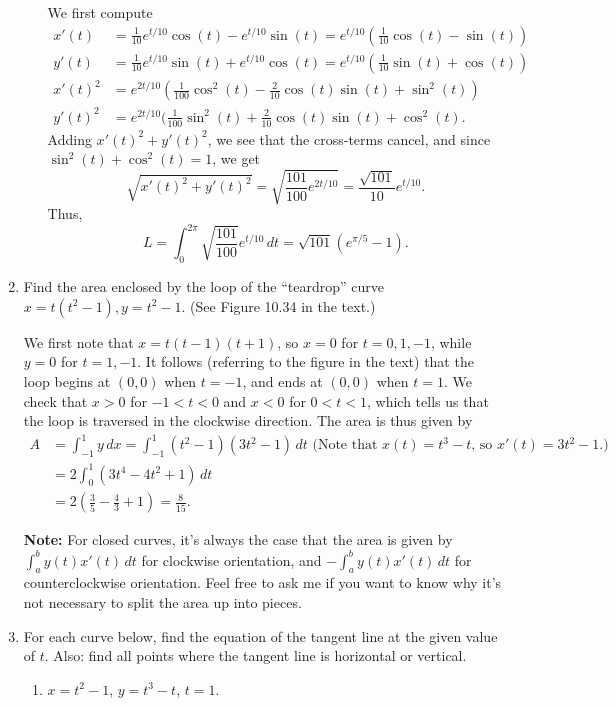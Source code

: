 \documentclass[12pt]{article}
\newcommand{\di}{\displaystyle}
\begin{document}
\begin{enumerate}
\begin{enumerate}
 We first compute
 \begin{align*}
 x'(t) & = \frac{1}{10}e^{t/10}\cos(t)-e^{t/10}\sin(t)=e^{t/10}(\frac{1}{10}\cos(t)-\sin(t))\\
 y'(t) & = \frac{1}{10}e^{t/10}\sin(t)+e^{t/10}\cos(t)=e^{t/10}(\frac{1}{10}\sin(t)+\cos(t))\\
 x'(t)^2&= e^{2t/10}(\frac{1}{100}\cos^2(t)-\frac{2}{10}\cos(t)\sin(t)+\sin^2(t))\\
 y'(t)^2&= e^{2t/10}(\frac{1}{100}\sin^2(t)+\frac{2}{10}\cos(t)\sin(t)+\cos^2(t).
 \end{align*}
 Adding $x'(t)^2+y'(t)^2$, we see that the cross-terms cancel, and since $\sin^2(t)+\cos^2(t)=1$, we get
 \[
 \sqrt{x'(t)^2+y'(t)^2} = \sqrt{\frac{101}{100}e^{2t/10}}=\frac{\sqrt{101}}{10}e^{t/10}.
 \]
 Thus,
 \[
 L = \int_0^{2\pi}\sqrt{\frac{101}{100}}e^{t/10}\,dt = \sqrt{101}(e^{\pi/5}-1).
 \]
\end{enumerate}


 \item Find the area enclosed by the loop of the ``teardrop'' curve $x=t(t^2-1), y=t^2-1$. (See Figure 10.34 in the text.)

We first note that $x = t(t-1)(t+1)$, so $x=0$ for $t=0,1,-1$, while $y=0$ for $t=1, -1$. It follows (referring to the figure in the text) that the loop begins at $(0,0)$ when $t=-1$, and ends at $(0,0)$ when $t=1$. We check that $x>0$ for $-1<t<0$ and $x<0$ for $0<t<1$, which tells us that the loop is traversed in the clockwise direction. The area is thus given by
\begin{align*}
 A & = \int_{-1}^1 y\,dx = \int_{-1}^1 (t^2-1)(3t^2-1)\,dt \text{ (Note that $x(t)=t^3-t$, so $x'(t) = 3t^2-1$.)}\\
& = 2\int_0^1 (3t^4-4t^2+1)\,dt\\
& = 2\left(\frac{3}{5}-\frac{4}{3}+1\right) = \frac{8}{15}.
\end{align*}
 
 \textbf{Note:} For closed curves, it's always the case that the area is given by $\di\int_a^b y(t)x'(t)\,dt$ for clockwise orientation, and $\di-\int_a^by(t)x'(t)\,dt$ for counterclockwise orientation. Feel free to ask me if you want to know why it's not necessary to split the area up into pieces.
 

\item For each curve below, find the equation of the tangent line at the given value of $t$. Also: find all points where the tangent line is horizontal or vertical.
\begin{enumerate}
\item $x=t^2-1$, $y=t^3-t$, $t=1$.


\end{enumerate}
\end{enumerate}
\end{document}
